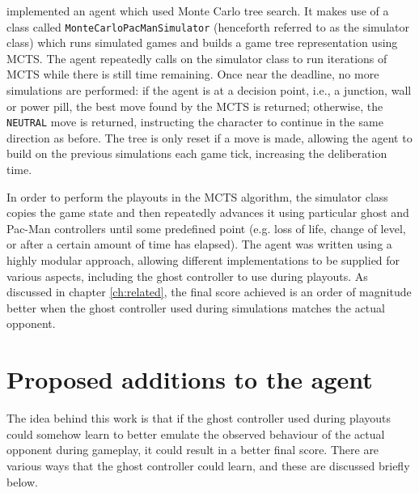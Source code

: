 \citet{Me2012} implemented an agent which used Monte Carlo tree search.  It makes use of a class called {\tt MonteCarloPacManSimulator} (henceforth referred to as the simulator class) which runs simulated games and builds a game tree representation using MCTS.  The agent repeatedly calls on the simulator class to run iterations of MCTS while there is still time remaining.  Once near the deadline, no more simulations are performed: if the agent is at a decision point, i.e., a junction, wall or power pill, the best move found by the MCTS is returned; otherwise, the {\tt NEUTRAL} move is returned, instructing the character to continue in the same direction as before.  The tree is only reset if a move is made, allowing the agent to build on the previous simulations each game tick, increasing the deliberation time.

In order to perform the playouts in the MCTS algorithm, the simulator class copies the game state and then repeatedly advances it using particular ghost and Pac-Man controllers until some predefined point (e.g. loss of life, change of level, or after a certain amount of time has elapsed).  The agent was written using a highly modular approach, allowing different implementations to be supplied for various aspects, including the ghost controller to use during playouts.  As discussed in chapter \ref{ch:related}, the final score achieved is an order of magnitude better when the ghost controller used during simulations matches the actual opponent.

\section{Proposed additions to the agent}
\label{sec:proposedadditions}

The idea behind this work is that if the ghost controller used during playouts could somehow learn to better emulate the observed behaviour of the actual opponent during gameplay, it could result in a better final score.  There are various ways that the ghost controller could learn, and these are discussed briefly below.

